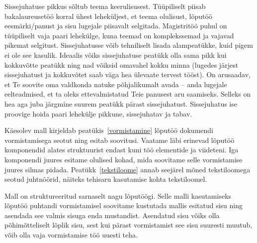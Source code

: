 Sissejuhatuse pikkus sõltub teema keerulisusest. Tüüpiliselt piisab bakalaureusetöö korral ühest leheküljest, et teema olulisust, lõputöö eesmärki/panust ja sisu lugejale piisavalt selgitada. Magistritöö puhul on tüüpiliselt vaja paari lehekülge, kuna teemad on komplekssemad ja vajavad pikemat selgitust. Sissejuhatusse võib tehniliselt lisada alampeatükke, kuid pigem ei ole see kasulik. Ideaalis võiks sissejuhatuse peatükk olla sama pikk kui kokkuvõtte peatükk ning nad võiksid omavahel kokku minna (lugedes järjest sissejuhatust ja kokkuvõtet saab väga hea ülevaate tervest tööst). On arusaadav, et Te soovite oma valdkonda natuke põhjalikumalt avada – anda lugejale eelteadmised, et ta oleks ettevalmistatud Teie panusest aru saamiseks. Selleks on hea aga juba järgmine suurem peatükk pärast sissejuhatust. Sissejuhatus ise proovige hoida paari lehekülje pikkune, sissejuhatav ja tabav.

Käesolev mall kirjeldab peatükis~\ref{vormistamine} lõputöö dokumendi vormistamisega seotut ning esitab soovitusi. Vaatame läbi erinevad lõputöö komponendid alates struktuurist endast kuni töö elementide ja viideteni. Iga komponendi juures esitame olulised kohad, mida soovitame selle vormistamise juures silmas pidada. Peatükk~\ref{tekstiloome} annab seejärel mõned tekstiloomega seotud juhtnöörid, näiteks tehisaru kasutamise kohta tekstiloomel.

Mall on struktureeritud sarnaselt nagu lõputöögi. Selle malli kasutamiseks lõputöö puhtandi vormistamisel soovitame kustutada mallis esitatud sisu ning asendada see valmis sisuga enda mustandist. Asendatud sisu võiks olla põhimõtteliselt lõplik sisu, sest kui pärast vormistamist see sisu suuresti muutub, võib olla vaja vormistamise töö uuesti teha.
